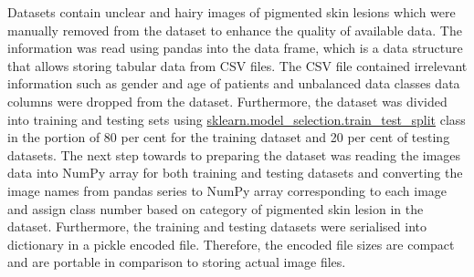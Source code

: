 Datasets contain unclear and hairy images of pigmented skin lesions which were manually 
removed from the dataset to enhance the quality of available data. The information was read using pandas into the data frame, 
which is a data structure that allows storing tabular data from CSV files. The CSV file contained irrelevant information such as gender and age of 
patients and unbalanced data classes data columns were dropped from the dataset. Furthermore, the dataset was divided into training and 
testing sets using \url{sklearn.model_selection.train_test_split} class in the portion of 80 per cent for 
the training dataset and 20 per cent of testing datasets. The next step towards to preparing the dataset was reading the images data into NumPy 
array for both training and testing datasets and converting the image names from pandas series to NumPy array corresponding to each image and assign class number 
based on category of pigmented skin lesion in the dataset. Furthermore, the training and testing datasets were serialised into 
dictionary in a pickle encoded file. Therefore, the encoded file sizes are compact and are portable
in comparison to storing actual image files.